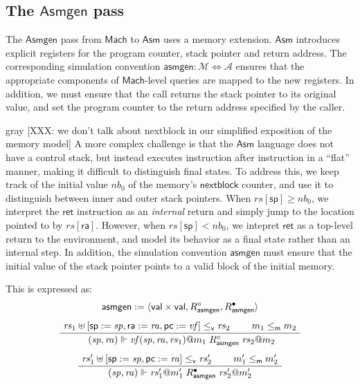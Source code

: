 \documentclass[acmsmall,screen,review,anonymous]{acmart}
\newcommand{\kw}[1]{\ensuremath{ \mathsf{#1} }}
\newcommand{\que}{\circ}
\newcommand{\ans}{\bullet}
\newcommand{\vref}{\le_\kw{v}}
\newcommand{\mext}{\le_\kw{m}}
\newenvironment{optional}{\begin{color}{gray}}{\end{color}}
\begin{document}

\subsection{The \kw{Asmgen} pass} \label{sec:asmgen} %

The \kw{Asmgen} pass from \kw{Mach} to \kw{Asm}
uses a memory extension.
\kw{Asm} introduces explicit registers for the
program counter, stack pointer and return address.
The corresponding simulation convention
$\kw{asmgen} : \mathcal{M} \Leftrightarrow \mathcal{A}$
ensures that the appropriate components of
\kw{Mach}-level queries are mapped to the new registers.
In addition,
we must ensure that the call returns the stack pointer
to its original value,
and set the program counter to the return address
specified by the caller.

\begin{optional}
[XXX: we don't talk about nextblock in our simplified
exposition of the memory model]
A more complex challenge is that the $\kw{Asm}$ language
does not have a control stack,
but instead executes instruction after instruction
in a ``flat'' manner,
making it difficult to distinguish final states.
To address this,
we keep track of the initial value $\mathit{nb}_0$ of
the memory's $\kw{nextblock}$ counter,
and use it to distinguish between inner and outer
stack pointers.
When $\mathit{rs}[\kw{sp}] \ge \mathit{nb}_0$,
we interpret the \kw{ret} instruction as an \emph{internal} return
and simply jump to the location pointed to by $\mathit{rs}[\kw{ra}]$.
However, when $\mathit{rs}[\kw{sp}] < \mathit{nb}_0$,
we intepret \kw{ret} as a top-level return to the environment,
and model its behavior as a final state
rather than an internal step.
In addition,
the simulation convention $\kw{asmgen}$
must ensure that the initial value of the stack pointer
points to a valid block of the initial memory.
\end{optional}

This is expressed as:
\begin{gather*}
  \kw{asmgen} := \langle \kw{val} \times \kw{val},
    R_\kw{asmgen}^\que, R_\kw{asmgen}^\ans \rangle
  \\[1ex]
  \AxiomC{$\mathit{rs}_1 \uplus
    [\kw{sp} := \mathit{sp}, \kw{ra} := \mathit{ra}, \kw{pc} := \mathit{vf}]
    \vref \mathit{rs}_2$}
  \AxiomC{$m_1 \mext m_2$}
  \BinaryInfC{
    $(\mathit{sp}, \mathit{ra}) \Vdash
     \mathit{vf}(\mathit{sp}, \mathit{ra}, \mathit{rs}_1)@m_1
     \mathrel{R_\kw{asmgen}^\que}
     \mathit{rs}_2@m_2$}
  \DisplayProof
  \\[1ex]
  \AxiomC{$
    \mathit{rs}_1' \uplus [\kw{sp} := \mathit{sp}, \kw{pc} := \mathit{ra}]
    \vref \mathit{rs}_2'$}
  \AxiomC{$m_1' \mext m_2'$}
  \BinaryInfC{$
    (\mathit{sp}, \mathit{ra}) \Vdash \mathit{rs}_1'@m_1'
    \mathrel{R_\kw{asmgen}^\ans}
    \mathit{rs}_2'@m_2'$}
  \DisplayProof
\end{gather*}
\end{document}
